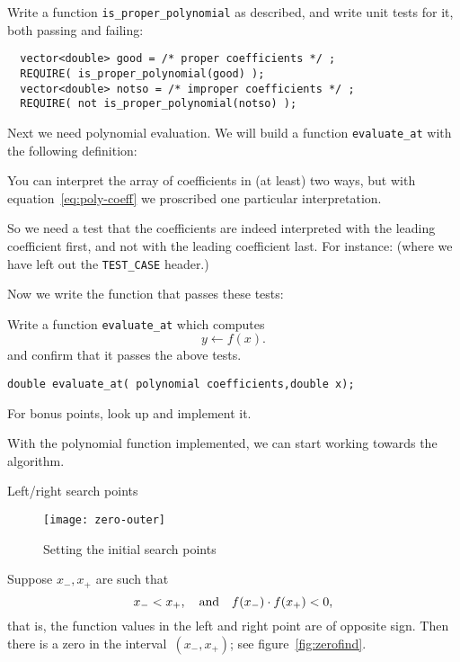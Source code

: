 \begin{exercise}
  \label{ex:proper-poly}
  Write a function \lstinline+is_proper_polynomial+ as described,
  and write unit tests for it, both passing and failing:
\begin{lstlisting}
  vector<double> good = /* proper coefficients */ ;
  REQUIRE( is_proper_polynomial(good) );
  vector<double> notso = /* improper coefficients */ ;
  REQUIRE( not is_proper_polynomial(notso) );
\end{lstlisting}
\end{exercise}

Next we need polynomial evaluation.
We will build a function \lstinline{evaluate_at} with the
following definition:

You can interpret the array of coefficients in
(at least) two ways, but with equation~\eqref{eq:poly-coeff}
we proscribed one particular interpretation.

So we need a  test that the coefficients are
indeed interpreted with the leading coefficient first,
and not with the leading coefficient last.
For instance:
%
%
(where we have left out the \lstinline+TEST_CASE+ header.)

Now we write the function that passes these tests:

\begin{exercise}
  \label{ex:bisect-eval}
  Write a function \lstinline+evaluate_at+ which computes
  \[ y \leftarrow f(x) . \]
  and confirm that it passes the above tests.
\begin{lstlisting}
double evaluate_at( polynomial coefficients,double x);
\end{lstlisting}
  For bonus points, look up 
  and implement it.
\end{exercise}

With the polynomial function implemented,
we can start working towards the algorithm.

 {Left/right search points}

\begin{figure}[ht]
  \texttt{[image: zero-outer]}
  \caption{Setting the initial search points}
  \label{fig:zero-outer}
\end{figure}

Suppose $x_-,x_+$ are such that 
\[ x_-<x_+,\quad\hbox{and}\quad f(x_-)\cdot f(x_+)<0,\]
that is, the function values in the left and right point are of opposite sign.
Then there is a zero in the interval~$(x_-,x_+)$;
see figure~\ref{fig:zerofind}.


